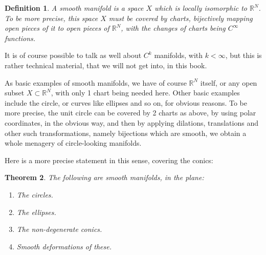 \documentclass[12pt]{amsbook}
\newtheorem{theorem}{Theorem}[chapter]
\newtheorem{definition}[theorem]{Definition}
\begin{document}
\begin{definition}
A smooth manifold is a space $X$ which is locally isomorphic to $\mathbb R^N$. To be more precise, this space $X$ must be covered by charts, bijectively mapping open pieces of it to open pieces of $\mathbb R^N$, with the changes of charts being $C^\infty$ functions.
\end{definition}

It is of course possible to talk as well about $C^k$ manifolds, with $k<\infty$, but this is rather technical material, that we will not get into, in this book.

\bigskip

As basic examples of smooth manifolds, we have of course $\mathbb R^N$ itself, or any open subset $X\subset\mathbb R^N$, with only 1 chart being needed here. Other basic examples include the circle, or curves like ellipses and so on, for obvious reasons. To be more precise, the unit circle can be covered by 2 charts as above, by using polar coordinates, in the obvious way, and then by applying dilations, translations and other such transformations, namely bijections which are smooth, we obtain a whole menagery of circle-looking manifolds.  

\bigskip

Here is a more precise statement in this sense, covering the conics:


\begin{theorem}
The following are smooth manifolds, in the plane:
\begin{enumerate}
\item The circles.

\item The ellipses.

\item The non-degenerate conics.

\item Smooth deformations of these.
\end{enumerate}
\end{theorem}
\end{document}
